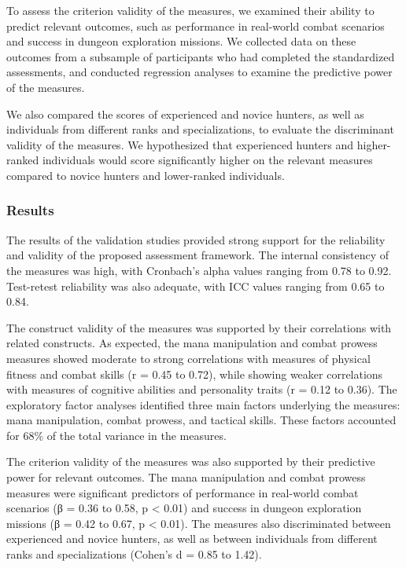 \documentclass[12pt, a4paper]{article}
\begin{document}
To assess the criterion validity of the measures, we examined their ability to predict relevant outcomes, such as performance in real-world combat scenarios and success in dungeon exploration missions. We collected data on these outcomes from a subsample of participants who had completed the standardized assessments, and conducted regression analyses to examine the predictive power of the measures.

We also compared the scores of experienced and novice hunters, as well as individuals from different ranks and specializations, to evaluate the discriminant validity of the measures. We hypothesized that experienced hunters and higher-ranked individuals would score significantly higher on the relevant measures compared to novice hunters and lower-ranked individuals.

\subsubsection{Results}

The results of the validation studies provided strong support for the reliability and validity of the proposed assessment framework. The internal consistency of the measures was high, with Cronbach's alpha values ranging from 0.78 to 0.92. Test-retest reliability was also adequate, with ICC values ranging from 0.65 to 0.84.

The construct validity of the measures was supported by their correlations with related constructs. As expected, the mana manipulation and combat prowess measures showed moderate to strong correlations with measures of physical fitness and combat skills (r = 0.45 to 0.72), while showing weaker correlations with measures of cognitive abilities and personality traits (r = 0.12 to 0.36). The exploratory factor analyses identified three main factors underlying the measures: mana manipulation, combat prowess, and tactical skills. These factors accounted for 68\% of the total variance in the measures.

The criterion validity of the measures was also supported by their predictive power for relevant outcomes. The mana manipulation and combat prowess measures were significant predictors of performance in real-world combat scenarios (β = 0.36 to 0.58, p < 0.01) and success in dungeon exploration missions (β = 0.42 to 0.67, p < 0.01). The measures also discriminated between experienced and novice hunters, as well as between individuals from different ranks and specializations (Cohen's d = 0.85 to 1.42).
\end{document}
